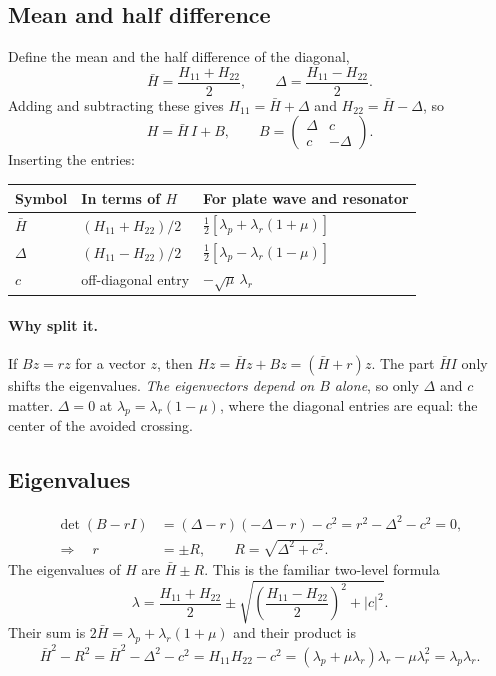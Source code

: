 \subsection{Mean and half difference}
Define the mean and the half difference of the diagonal,
\begin{equation}
  \bar{H} = \frac{H_{11} + H_{22}}{2}, \qquad \Delta = \frac{H_{11} - H_{22}}{2} .
\end{equation}
Adding and subtracting these gives $H_{11} = \bar{H} + \Delta$ and
$H_{22} = \bar{H} - \Delta$, so
\begin{equation}
  H = \bar{H}\, I + B, \qquad B = \begin{pmatrix} \Delta & c \\ c & -\Delta \end{pmatrix} .
\end{equation}
Inserting the entries:

\begin{center}
\begin{tabular}{|l|l|l|}
\hline
Symbol & In terms of $H$ & For plate wave and resonator \\
\hline
$\bar{H}$ & $(H_{11} + H_{22})/2$ & $\tfrac12\left[\lambda_p + \lambda_r(1+\mu)\right]$ \\
$\Delta$ & $(H_{11} - H_{22})/2$ & $\tfrac12\left[\lambda_p - \lambda_r(1-\mu)\right]$ \\
$c$ & off-diagonal entry & $-\sqrt{\mu}\,\lambda_r$ \\
\hline
\end{tabular}
\end{center}

\paragraph{Why split it.} If $Bz = rz$ for a vector $z$, then
$Hz = \bar{H}z + Bz = (\bar{H} + r)z$. The part $\bar{H}I$ only shifts the
eigenvalues. \emph{The eigenvectors depend on $B$ alone}, so only $\Delta$ and $c$
matter. $\Delta = 0$ at $\lambda_p = \lambda_r(1-\mu)$, where the diagonal entries
are equal: the center of the avoided crossing.

\subsection{Eigenvalues}
\begin{align}
  \det(B - rI) &= (\Delta - r)(-\Delta - r) - c^2 = r^2 - \Delta^2 - c^2 = 0, \\
  \Rightarrow\quad r &= \pm R, \qquad R = \sqrt{\Delta^2 + c^2} .
\end{align}
The eigenvalues of $H$ are $\bar{H} \pm R$. This is the familiar two-level formula
\begin{equation}
  \lambda = \frac{H_{11} + H_{22}}{2} \pm \sqrt{\left(\frac{H_{11} - H_{22}}{2}\right)^2 + |c|^2} .
\end{equation}
Their sum is $2\bar{H} = \lambda_p + \lambda_r(1+\mu)$ and their product is
\begin{equation}
  \bar{H}^2 - R^2 = \bar{H}^2 - \Delta^2 - c^2 = H_{11}H_{22} - c^2
  = (\lambda_p + \mu\lambda_r)\lambda_r - \mu\lambda_r^2 = \lambda_p\lambda_r .
\end{equation}

